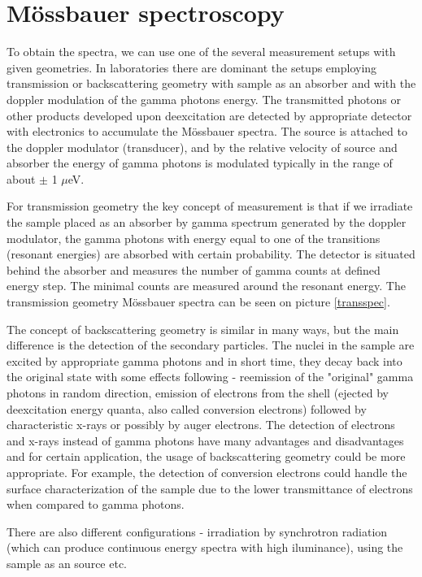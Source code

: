 \section{Mössbauer spectroscopy}
To obtain the spectra, we can use one of the several measurement setups with given geometries. In laboratories there are dominant the setups employing transmission or backscattering geometry with sample as an absorber and with the doppler modulation of the gamma photons energy. The transmitted photons or other products developed upon deexcitation are detected by appropriate detector with electronics to accumulate the Mössbauer spectra. The source is attached to the doppler modulator (transducer), and by the relative velocity of source and absorber the energy of gamma photons is modulated typically in the range of about $\pm$ 1 $\mu$eV.
\par
For transmission geometry the key concept of measurement is that if we irradiate the sample placed as an absorber by gamma spectrum generated by the doppler modulator, the gamma photons with energy equal to one of the transitions (resonant energies) are absorbed with certain probability. 
The detector is situated behind the absorber and measures the number of gamma counts at defined energy step. The minimal counts are measured around the resonant energy. The transmission geometry Mössbauer spectra can be seen on picture \ref{transspec}.

\par
The concept of backscattering geometry is similar in many ways, but the main difference is the detection of the secondary particles. The nuclei in the sample are excited by appropriate gamma photons and in short time, they decay back into the original state with some effects following - reemission of the "original" gamma photons in random direction, emission of electrons from the shell (ejected by deexcitation energy quanta, also called conversion electrons) followed by characteristic x-rays or possibly by auger electrons. The detection of electrons and x-rays instead of gamma photons have many advantages and disadvantages and for certain application, the usage of backscattering geometry could be more appropriate. For example, the detection of conversion electrons could handle the surface characterization of the sample due to the lower transmittance of electrons when compared to gamma photons.


\par
There are also different configurations - irradiation by synchrotron radiation (which can produce continuous energy spectra with high iluminance), using the sample as an source etc.



